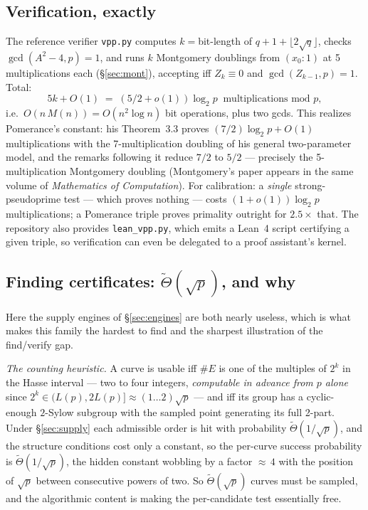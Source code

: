 \documentclass[11pt]{amsart}
\newcommand{\Tt}{\widetilde{\Theta}}
\theoremstyle{plain}
\theoremstyle{definition}
\theoremstyle{remark}
\begin{document}
\subsection{Verification, exactly}\label{sec:pomverif}

The reference verifier \texttt{vpp.py} \cite{DANGER3} computes $k = {}$bit-length of
$q+1+\lfloor 2\sqrt q\rfloor$, checks $\gcd(A^2-4, p) = 1$, and runs $k$ Montgomery doublings from
$(x_0 : 1)$ at 5 multiplications each (\S\ref{sec:mont}), accepting iff $Z_k \equiv 0$ and
$\gcd(Z_{k-1}, p) = 1$.  Total:
\[
  5k + O(1) \;=\; (5/2 + o(1))\log_2 p \ \text{ multiplications mod } p,
\]
i.e.\ $O(n\,M(n)) = O(n^2\log n)$ bit operations, plus two gcds.  This realizes Pomerance's constant: his Theorem~3.3 proves
$(7/2)\log_2 p + O(1)$ multiplications with the 7-multiplication doubling of his general two-parameter
model, and the remarks following it reduce $7/2$ to $5/2$ --- precisely the 5-multiplication Montgomery
doubling (Montgomery's paper \cite{Mon87} appears in the same volume of \emph{Mathematics of
Computation}).  For calibration: a \emph{single} strong-pseudoprime test --- which proves nothing ---
costs $(1+o(1))\log_2 p$ multiplications; a Pomerance triple proves primality outright for $2.5\times$
that.  The repository also provides \texttt{lean\_vpp.py}, which emits a Lean~4 script certifying a
given triple, so verification can even be delegated to a proof assistant's kernel.

\subsection{Finding certificates: \texorpdfstring{$\Tt(\sqrt p)$}{Theta-tilde(sqrt p)}, and why}\label{sec:pomfind}

Here the supply engines of \S\ref{sec:engines} are both nearly useless, which is what makes this family
the hardest to find and the sharpest illustration of the find/verify gap.

\emph{The counting heuristic.}  A curve is usable iff $\#E$ is one of the multiples of $2^k$ in the
Hasse interval --- two to four integers, \emph{computable in advance from $p$ alone} since
$2^k \in (L(p), 2L(p)] \approx (1\dots 2)\sqrt p$ --- and iff its group has a cyclic-enough $2$-Sylow
subgroup with the sampled point generating its full 2-part.  Under \S\ref{sec:supply} each admissible
order is hit with probability $\Tt(1/\sqrt p)$, and the structure conditions cost only a constant, so
the per-curve success probability is $\Tt(1/\sqrt p)$, the hidden constant wobbling by a factor
${\approx}\,4$ with the position of $\sqrt p$ between consecutive powers of two.  So $\Tt(\sqrt p)$
curves must be sampled, and the algorithmic content is making the per-candidate test essentially free.
\end{document}
